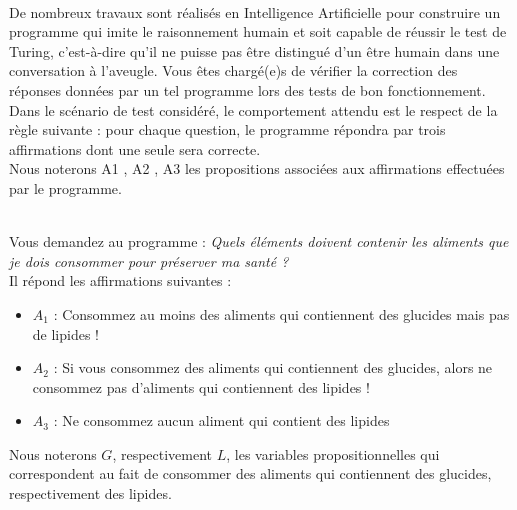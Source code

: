 \documentclass[11pt,a4paper]{article}
\begin{document}
\begin{Exercise}[title = {Logique et calcul des propositions}, origin = {\bac \; {\sc ccp 2015}}]\\
De nombreux travaux sont réalisés en Intelligence Artificielle pour construire un programme qui imite le raisonnement humain et soit capable de réussir le test de Turing, c’est-à-dire qu’il ne puisse pas être distingué d’un être humain dans une conversation à l’aveugle. Vous êtes chargé(e)s de vérifier la correction des réponses données par un tel programme lors des tests de bon fonctionnement. Dans le scénario de test considéré, le comportement attendu est le respect de la règle suivante : pour chaque question, le programme répondra par trois affirmations dont une seule sera correcte. \\
Nous noterons A1 , A2 , A3 les propositions associées aux affirmations effectuées par le programme.


\ExePart[name = Premier cas]\\
Vous demandez au programme : \og {} \textit{Quels éléments doivent contenir les aliments que je dois consommer pour préserver ma santé ?}\fg{}\\
Il répond les affirmations suivantes :
\begin{itemize}
	\item[] $A_1$ : Consommez au moins des aliments qui contiennent des glucides mais pas de lipides !
	\item[] $A_2$ : Si vous consommez des aliments qui contiennent des glucides, alors ne consommez pas d'aliments qui contiennent des lipides !
	\item[] $A_3$ : Ne consommez aucun aliment qui contient des lipides
\end{itemize}
Nous noterons $G$, respectivement $L$, les variables propositionnelles qui correspondent au fait de consommer des aliments qui contiennent des glucides, respectivement des lipides.


\end{Exercise}
\end{document}
